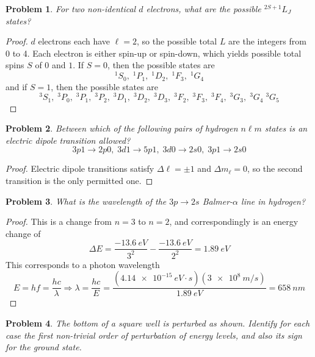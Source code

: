 \documentclass{article}
\newtheorem{plm}{Problem}
\begin{document}
\begin{plm}
  For two non-identical $d$ electrons, what are the possible ${}^{2S+1}L_{J}$ states?
\end{plm}

\begin{proof}
  $d$ electrons each have $\ell = 2$, so the possible total $L$ are the integers from 0 to 4.
  Each electron is either spin-up or spin-down, which yields possible total spins $S$ of $0$ and $1$.
  If $S = 0$, then the possible states are
  \[
    {}^{1}S_{0}, \; {}^{1}P_{1}, \; {}^{1}D_{2}, \; {}^{1}F_{3}, \; {}^{1}G_{4}
  \]
  and if $S = 1$, then the possible states are
  \[
    {}^{3}S_{1}, \; {}^{3}P_{0}, \; {}^{3}P_{1}, \; {}^{3}P_{2}, \; {}^{3}D_{1}, \; {}^{3}D_{2}, \; {}^{3}D_{3}, \; {}^{3}F_{2}, \; {}^{3}F_{3}, \;
    {}^{3}F_{4}, \; {}^{3}G_{3}, \; {}^{3}G_{4} \; {}^{3}G_{5}
  \]
\end{proof}

\begin{plm}
  Between which of the following pairs of hydrogen $n\ell m$ states is an electric dipole transition allowed?
  \[
    3p1 \to 2p0, \; 3d1 \to 5p1, \; 3d0 \to 2s0, \; 3p1 \to 2s0
  \]
\end{plm}

\begin{proof}
  Electric dipole transitions satisfy $\Delta \ell = \pm 1$ and $\Delta m_{\ell} = 0$, so the second transition is the only permitted one.
\end{proof}

\begin{plm}
  What is the wavelength of the $3p \to 2s$ Balmer-$\alpha$ line in hydrogen?
\end{plm}

\begin{proof}
  This is a change from $n = 3$ to $n = 2$, and correspondingly is an energy change of
  \[
    \Delta E = \frac{\SI{-13.6}{eV}}{3^{2}} - \frac{\SI{-13.6}{eV}}{2^{2}} = \SI{1.89}{eV}
  \]
  This corresponds to a photon wavelength
  \[
    E = hf = \frac{hc}{\lambda} \Rightarrow \lambda = \frac{hc}{E} = \frac{(\SI{4.14e-15}{eV \cdot s})(\SI{3e8}{m/s})}{\SI{1.89}{eV}}
    = \SI{658}{nm}
  \]
\end{proof}

\begin{plm}
  The bottom of a square well is perturbed as shown.
  Identify for each case the first non-trivial order of perturbation of energy levels, and also its sign for the ground state.
\end{plm}
\end{document}
